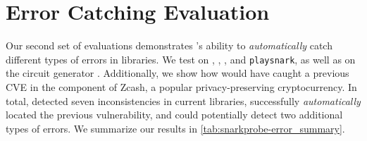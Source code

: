 \section{Error Catching Evaluation}
\label{sec:snarkprobe-errorcatching}

Our second set of evaluations demonstrates \snarkprobe's ability to \emph{automatically} catch different types of errors in \zksnark libraries.  We test \snarkprobe on \libsnark, \bellman, \arkworks, and \texttt{playsnark}, as well as on the circuit generator \circom.  Additionally, we show how \snarkprobe would have caught a previous CVE in the \zksnark component of Zcash, a popular privacy-preserving cryptocurrency.  In total, \snarkprobe detected seven inconsistencies in current \zksnark libraries, successfully \textit{automatically} located the previous vulnerability, and could potentially detect two additional types of errors. %
We summarize our results in \autoref{tab:snarkprobe-error_summary}.%


%


